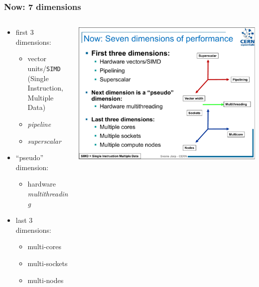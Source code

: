 \documentclass[9pt]{beamer}
\begin{document}
\begin{frame}
  \frametitle{Now: 7 dimensions}
  \begin{columns}
    \begin{column}{0.5\textwidth}

      \begin{itemize}
      \item first \alert{3} dimensions:
        \begin{itemize}
        \item vector units/\texttt{SIMD} (Single Instruction, Multiple Data)
        \item \emph{pipeline}
        \item \emph{superscalar}
        \end{itemize}
      \item ``pseudo'' dimension:
        \begin{itemize}
        \item hardware \emph{multithreading}
        \end{itemize}
      \item last \alert{3} dimensions:
        \begin{itemize}
        \item multi-cores
        \item multi-sockets
        \item multi-nodes
        \end{itemize}
      \end{itemize}
    \end{column}

    \begin{column}{0.5\textwidth}
      \begin{center}
        \includegraphics[width=.925\textwidth]{figs/sverre-seven-dims.pdf}
      \end{center}
    \end{column}
  \end{columns}
\end{frame}
\end{document}
